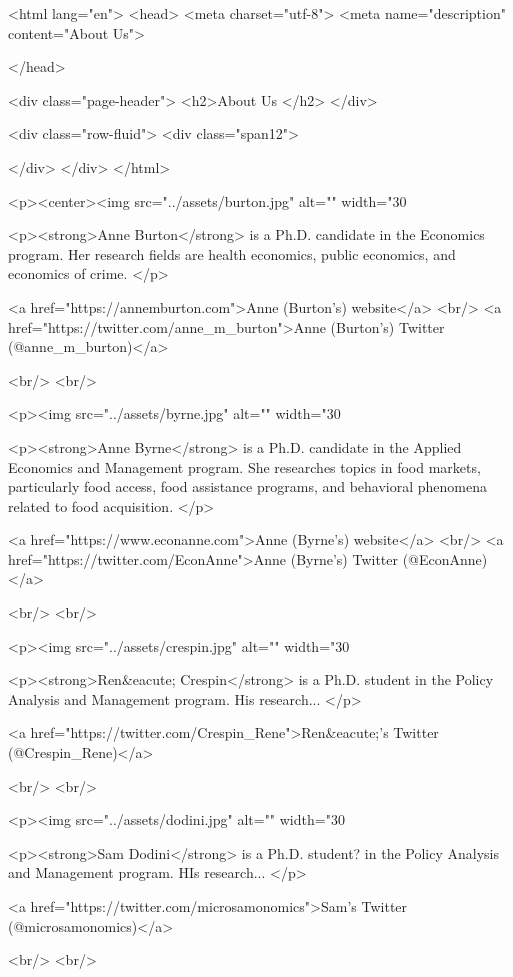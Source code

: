 <html lang="en">
  <head>
    <meta charset="utf-8">
    <meta name="description" content="About Us">
  
  </head>

        

<div class="page-header">
  <h2>About Us </h2>
</div>

<div class="row-fluid">
  <div class="span12">
  
  </div>
</div>
</html>
        
 <p><center><img src="../assets/burton.jpg" alt="" width="30%

<p><strong>Anne Burton</strong> is a Ph.D. candidate in the Economics program. Her research fields are health economics, public economics, and economics of crime. </p>

<a href="https://annemburton.com">Anne (Burton's) website</a>
<br/>
<a href="https://twitter.com/anne_m_burton">Anne (Burton's) Twitter (@anne_m_burton)</a>

    <br/>
    <br/>
    
<p><img src="../assets/byrne.jpg" alt="" width="30%

 <p><strong>Anne Byrne</strong> is a Ph.D. candidate in the Applied Economics and Management program. She researches topics in food markets, particularly food access, food assistance programs, and behavioral phenomena related to food acquisition. </p>

    <a href="https://www.econanne.com">Anne (Byrne's) website</a>
    <br/>
    <a href="https://twitter.com/EconAnne">Anne (Byrne's) Twitter (@EconAnne)</a>
    
    <br/>
    <br/>

<p><img src="../assets/crespin.jpg" alt="" width="30%

<p><strong>Ren&eacute; Crespin</strong> is a Ph.D. student in the Policy Analysis and Management program. His research... </p>

<a href="https://twitter.com/Crespin_Rene">Ren&eacute;'s Twitter (@Crespin_Rene)</a>

<br/>
<br/>

<p><img src="../assets/dodini.jpg" alt="" width="30%

<p><strong>Sam Dodini</strong> is a Ph.D. student? in the Policy Analysis and Management program. HIs research... </p>

<a href="https://twitter.com/microsamonomics">Sam's Twitter (@microsamonomics)</a>

<br/>
<br/>

